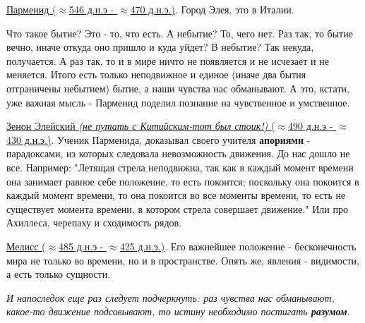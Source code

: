 \documentclass[12pt,a4paper]{article}
\begin{document}
\underline{Парменид ($\approx$546 д.н.э - $\approx$470 д.н.э.)}. Город Элея, это в Италии.


Что такое бытие? Это - то, что есть. А небытие? То, чего нет. Раз так, то бытие вечно, иначе откуда оно пришло и куда уйдет? В небытие? Так некуда, получается. А раз так, то и в мире ничто не появляется и не исчезает и не меняется. Итого есть только неподвижное и единое (иначе два бытия отграничены небытием) бытие, а наши чувства нас обманывают. А это, кстати, уже важная мысль - Парменид поделил познание на чувственное и умственное. 

\underline{Зенон Элейский \textit{(не путать с Китийским-тот был стоик!)} ($\approx$490 д.н.э - $\approx$430 д.н.э.)}. Ученик Парменида, доказывал своего учителя \textbf{апориями} - парадоксами, из которых следовала невозможность движения. До нас дошло не все. Например: "Летящая стрела неподвижна, так как в каждый момент времени она занимает равное себе положение, то есть покоится; поскольку она покоится в каждый момент времени, то она покоится во все моменты времени, то есть не существует момента времени, в котором стрела совершает движение." Или про Ахиллеса, черепаху и сходимость рядов.

\underline{Мелисс ($\approx$485 д.н.э - $\approx$425 д.н.э.)}. Его важнейшее положение - бесконечность мира не только во времени, но и в пространстве. Опять же, явления - видимости, а есть только сущности.

\textit{И напоследок еще раз следует подчеркнуть: раз чувства нас обманывают, какое-то движение подсовывают, то истину необходимо постигать \textbf{разумом}.}
\end{document}
